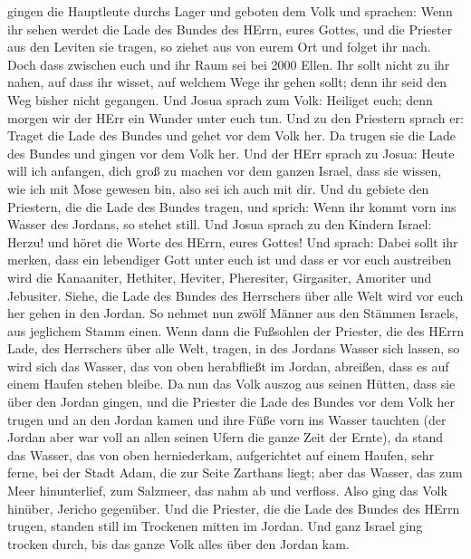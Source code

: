 gingen die Hauptleute durchs Lager  und geboten dem Volk und
sprachen: Wenn ihr sehen werdet die Lade des Bundes des HErrn, eures
Gottes, und die Priester aus den Leviten sie tragen, so ziehet aus von
eurem Ort und folget ihr nach.  Doch dass zwischen euch und
ihr Raum sei bei 2000 Ellen. Ihr sollt nicht zu ihr nahen, auf dass ihr
wisset, auf welchem Wege ihr gehen sollt; denn ihr seid den Weg bisher
nicht gegangen.  Und Josua sprach zum Volk: Heiliget euch;
denn morgen wir der HErr ein Wunder unter euch tun.  Und zu
den Priestern sprach er: Traget die Lade des Bundes und gehet vor dem
Volk her. Da trugen sie die Lade des Bundes und gingen vor dem Volk her.
 Und der HErr sprach zu Josua: Heute will ich anfangen, dich
groß zu machen vor dem ganzen Israel, dass sie wissen, wie ich mit Mose
gewesen bin, also sei ich auch mit dir.  Und du gebiete den
Priestern, die die Lade des Bundes tragen, und sprich: Wenn ihr kommt
vorn ins Wasser des Jordans, so stehet still.  Und Josua
sprach zu den Kindern Israel: Herzu! und höret die Worte des HErrn,
eures Gottes!  Und sprach: Dabei sollt ihr merken, dass ein
lebendiger Gott unter euch ist und dass er vor euch austreiben wird die
Kanaaniter, Hethiter, Heviter, Pheresiter, Girgasiter, Amoriter und
Jebusiter.  Siehe, die Lade des Bundes des Herrschers über
alle Welt wird vor euch her gehen in den Jordan.  So nehmet
nun zwölf Männer aus den Stämmen Israels, aus jeglichem Stamm einen.
 Wenn dann die Fußsohlen der Priester, die des HErrn Lade,
des Herrschers über alle Welt, tragen, in des Jordans Wasser sich
lassen, so wird sich das Wasser, das von oben herabfließt im Jordan,
abreißen, dass es auf einem Haufen stehen bleibe.  Da nun
das Volk auszog aus seinen Hütten, dass sie über den Jordan gingen, und
die Priester die Lade des Bundes vor dem Volk her trugen 
und an den Jordan kamen und ihre Füße vorn ins Wasser tauchten (der
Jordan aber war voll an allen seinen Ufern die ganze Zeit der Ernte),
 da stand das Wasser, das von oben herniederkam,
aufgerichtet auf einem Haufen, sehr ferne, bei der Stadt Adam, die zur
Seite Zarthans liegt; aber das Wasser, das zum Meer hinunterlief, zum
Salzmeer, das nahm ab und verfloss. Also ging das Volk hinüber, Jericho
gegenüber.  Und die Priester, die die Lade des Bundes des
HErrn trugen, standen still im Trockenen mitten im Jordan. Und ganz
Israel ging trocken durch, bis das ganze Volk alles über den Jordan kam.
